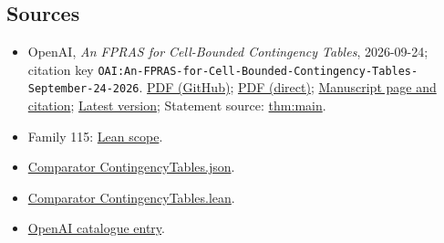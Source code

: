 \documentclass[11pt]{article}
\begin{document}
\subsection{Sources}
\begin{itemize}
\item OpenAI, \emph{An FPRAS for Cell-Bounded Contingency Tables}, 2026-09-24; citation key \texttt{OAI:An-FPRAS-for-Cell-Bounded-Contingency-Tables-September-24-2026}. \href{https://github.com/openai/math/blob/adc7f1241b42e322a6451854ab7e4b4c146bf78a/preprints/An-FPRAS-for-Cell-Bounded-Contingency-Tables-September-24-2026/main.pdf}{PDF (GitHub)}; \href{https://github.com/openai/math/raw/adc7f1241b42e322a6451854ab7e4b4c146bf78a/preprints/An-FPRAS-for-Cell-Bounded-Contingency-Tables-September-24-2026/main.pdf}{PDF (direct)}; \href{https://github.com/openai/math/blob/adc7f1241b42e322a6451854ab7e4b4c146bf78a/preprints/An-FPRAS-for-Cell-Bounded-Contingency-Tables-September-24-2026/README.md}{Manuscript page and citation}; \href{https://github.com/openai/math/blob/main/preprints/An-FPRAS-for-Cell-Bounded-Contingency-Tables-September-24-2026/main.pdf}{Latest version}; Statement source: \href{https://github.com/openai/math/blob/adc7f1241b42e322a6451854ab7e4b4c146bf78a/preprints/An-FPRAS-for-Cell-Bounded-Contingency-Tables-September-24-2026/build/sections/introduction.tex\#L21}{thm:main}.
\item Family 115: \href{https://github.com/openai/math/blob/adc7f1241b42e322a6451854ab7e4b4c146bf78a/lean/docs/115.md}{Lean scope}.
\item \href{https://github.com/openai/math/blob/adc7f1241b42e322a6451854ab7e4b4c146bf78a/lean/ComparatorChallenges/ContingencyTables.json}{Comparator ContingencyTables.json}.
\item \href{https://github.com/openai/math/blob/adc7f1241b42e322a6451854ab7e4b4c146bf78a/lean/ComparatorChallenges/ContingencyTables.lean}{Comparator ContingencyTables.lean}.
\item \href{https://github.com/openai/math/blob/adc7f1241b42e322a6451854ab7e4b4c146bf78a/CONTENTS.md}{OpenAI catalogue entry}.
\end{itemize}
\end{document}
